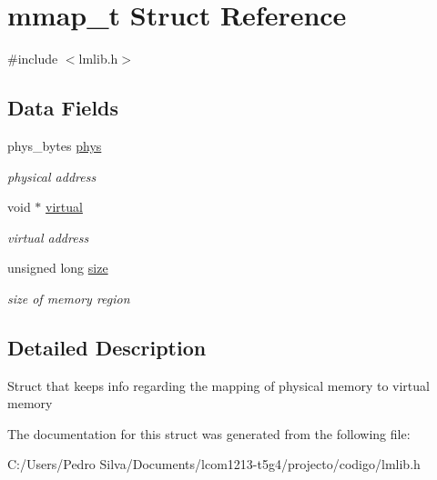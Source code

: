 \hypertarget{structmmap__t}{\section{mmap\-\_\-t Struct Reference}
\label{structmmap__t}
}


{\ttfamily \#include $<$lmlib.\-h$>$}

\subsection*{Data Fields}
\begin{DoxyCompactItemize}
\item 
\hypertarget{group___lmlib_gab7a85fe0db943529016cf606e3a7167f}{phys\-\_\-bytes \hyperlink{group___lmlib_gab7a85fe0db943529016cf606e3a7167f}{phys}}\label{group___lmlib_gab7a85fe0db943529016cf606e3a7167f}

\begin{DoxyCompactList}\small\item\em physical address \end{DoxyCompactList}\item 
\hypertarget{group___lmlib_ga6a0ea2231d30f2b025e0c4b9f12dd6db}{void $\ast$ \hyperlink{group___lmlib_ga6a0ea2231d30f2b025e0c4b9f12dd6db}{virtual}}\label{group___lmlib_ga6a0ea2231d30f2b025e0c4b9f12dd6db}

\begin{DoxyCompactList}\small\item\em virtual address \end{DoxyCompactList}\item 
\hypertarget{group___lmlib_ga1e1268d164c38e4f8a4f4eb9058b0601}{unsigned long \hyperlink{group___lmlib_ga1e1268d164c38e4f8a4f4eb9058b0601}{size}}\label{group___lmlib_ga1e1268d164c38e4f8a4f4eb9058b0601}

\begin{DoxyCompactList}\small\item\em size of memory region \end{DoxyCompactList}\end{DoxyCompactItemize}


\subsection{Detailed Description}
Struct that keeps info regarding the mapping of physical memory to virtual memory 

The documentation for this struct was generated from the following file\-:\begin{DoxyCompactItemize}
\item 
C\-:/\-Users/\-Pedro Silva/\-Documents/lcom1213-\/t5g4/projecto/codigo/lmlib.\-h\end{DoxyCompactItemize}
